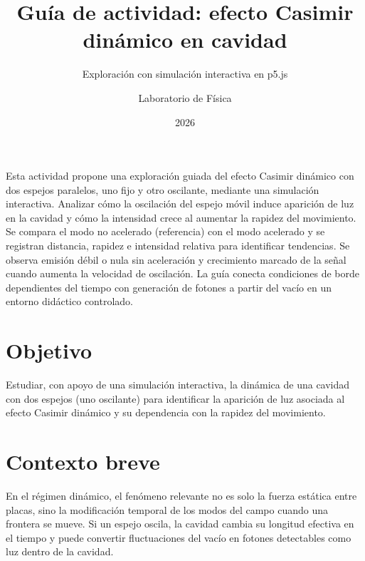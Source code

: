 \documentclass{aa}
\begin{document}
\title{Guía de actividad: efecto Casimir dinámico en cavidad}

\subtitle{Exploración con simulación interactiva en p5.js}

\author{Laboratorio de Física}


\date{2026}

\abstract
{Esta actividad propone una exploración guiada del efecto Casimir dinámico con dos espejos paralelos, uno fijo y otro oscilante, mediante una simulación interactiva.}
{Analizar cómo la oscilación del espejo móvil induce aparición de luz en la cavidad y cómo la intensidad crece al aumentar la rapidez del movimiento.}
{Se compara el modo no acelerado (referencia) con el modo acelerado y se registran distancia, rapidez e intensidad relativa para identificar tendencias.}
{Se observa emisión débil o nula sin aceleración y crecimiento marcado de la señal cuando aumenta la velocidad de oscilación.}
{La guía conecta condiciones de borde dependientes del tiempo con generación de fotones a partir del vacío en un entorno didáctico controlado.}


\maketitle

\section{Objetivo}

Estudiar, con apoyo de una simulación interactiva, la dinámica de una cavidad con dos espejos (uno oscilante) para identificar la aparición de luz asociada al efecto Casimir dinámico y su dependencia con la rapidez del movimiento.

\section{Contexto breve}

En el régimen dinámico, el fenómeno relevante no es solo la fuerza estática entre placas, sino la modificación temporal de los modos del campo cuando una frontera se mueve. Si un espejo oscila, la cavidad cambia su longitud efectiva en el tiempo y puede convertir fluctuaciones del vacío en fotones detectables como luz dentro de la cavidad.
\end{document}

